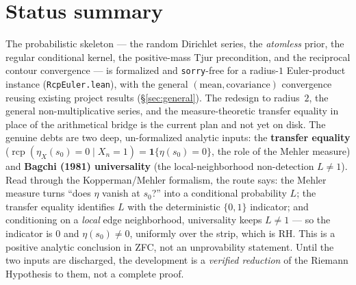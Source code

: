 \documentclass[11pt,a4paper]{article}
\theoremstyle{definition}
\newcommand{\etaX}{\eta_X}
\newcommand{\rcp}{\operatorname{rcp}}
\begin{document}
\section*{Status summary}

The probabilistic skeleton --- the random Dirichlet series, the \emph{atomless} prior, the
regular conditional kernel, the positive-mass Tjur precondition, and the reciprocal contour
convergence --- is formalized and \texttt{sorry}-free for a radius-\(1\) Euler-product
instance (\texttt{RcpEuler.lean}), with the general \((\text{mean},\text{covariance})\)
convergence reusing existing project results (\S\ref{sec:general}). The redesign to
radius~\(2\), the general non-multiplicative series, and the measure-theoretic transfer
equality in place of the arithmetical bridge is the current plan and not yet on disk. The
genuine debts are two deep, un-formalized analytic inputs: the \textbf{transfer equality}
(\(\rcp(\etaX(s_0)=0\mid X_n=1)=\mathbf{1}\{\eta(s_0)=0\}\), the role of the Mehler measure)
and \textbf{Bagchi (1981) universality} (the local-neighborhood non-detection \(L\neq1\)).
Read through the Kopperman/Mehler formalism, the route says: the Mehler measure turns ``does
\(\eta\) vanish at \(s_0\)?'' into a conditional probability \(L\); the transfer equality
identifies \(L\) with the deterministic \(\{0,1\}\) indicator; and conditioning on a
\emph{local} edge neighborhood, universality keeps \(L\neq1\) --- so the indicator is \(0\)
and \(\eta(s_0)\neq0\), uniformly over the strip, which is RH. This is a positive analytic
conclusion in ZFC, not an unprovability statement. Until the two inputs are discharged, the
development is a \emph{verified reduction} of the Riemann Hypothesis to them, not a complete
proof.
\end{document}

